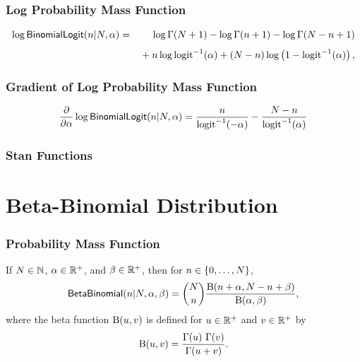 \subsubsection{Log Probability Mass Function}

\begin{eqnarray*}
\log \mbox{\sf BinomialLogit}(n|N,\alpha)
& = &
\log \Gamma(N+1) - \log \Gamma(n + 1) - \log \Gamma(N- n + 1)
\\[4pt]
& & { } + n \log \mbox{logit}^{-1}(\alpha) + (N - n) \log \left( 1 -
  \mbox{logit}^{-1}(\alpha) \right),
\end{eqnarray*}


\subsubsection{Gradient of Log Probability Mass Function}

\[
\frac{\partial}{\partial \alpha} \log \mbox{\sf BinomialLogit}(n|N,\alpha)
= \frac{n}{\mbox{logit}^{-1}(-\alpha)}
- \frac{N - n}{\mbox{logit}^{-1}(\alpha)}
\]


\subsubsection{Stan Functions}

\begin{description}
%
%
\end{description}



\section{Beta-Binomial Distribution}

\subsubsection{Probability Mass Function}

If $N \in \mathbb{N}$, $\alpha \in \mathbb{R}^+$, and $\beta \in \mathbb{R}^+$,
then for $n \in \{ 0,\ldots,N \}$,
\[
\mbox{\sf BetaBinomial}(n|N,\alpha,\beta)
=
\binom{N}{n} \frac{\mbox{B}(n+\alpha, N -n +
  \beta)}{\mbox{B}(\alpha,\beta)},
\]
%
where the beta function $\mbox{B}(u,v)$ is defined for $u \in
\mathbb{R}^+$ and $v \in \mathbb{R}^+$ by
%
\[
\mbox{B}(u,v)
= \frac{\Gamma(u) \ \Gamma(v)}{\Gamma(u + v)}.
\]

